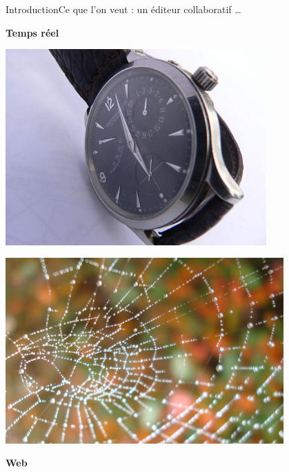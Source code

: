 \begin{frame}{Introduction}{Ce que l'on veut : un éditeur collaboratif \ldots}
  
  \begin{minipage}{0.45\textwidth}
    \hfill \YES{\cmark} \textbf{Temps réel}
  \end{minipage}
  \begin{minipage}{0.45\textwidth}
    \includegraphics[width=0.75\textwidth]{img/watch.jpg}
  \end{minipage}
    
  \vspace{-0.75cm}

  \begin{minipage}{0.45\textwidth}
    \hfill  \includegraphics[width=0.8\textwidth]{img/toile.jpg}
  \end{minipage}  
  \begin{minipage}{0.45\textwidth}
    \textbf{Web} \YES{\cmark}
  \end{minipage}
  
  \vspace{-0.75cm}
  

\end{frame}
